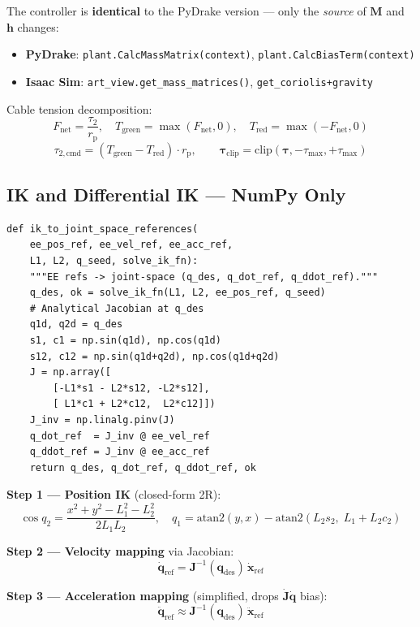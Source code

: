 \documentclass[11pt,a4paper]{article}
\newcommand{\rp}{r_{\mathrm{p}}}
\newcommand{\bq}{\bm{q}}
\newcommand{\bdq}{\dot{\bm{q}}}
\newcommand{\bddq}{\ddot{\bm{q}}}
\newcommand{\btau}{\bm{\tau}}
\newcommand{\bM}{\bm{M}}
\newcommand{\bh}{\bm{h}}
\newcommand{\bJ}{\bm{J}}
\newcommand{\bx}{\bm{x}}
\begin{document}
\begin{codemath}
The controller is \textbf{identical} to the PyDrake version --- only the \emph{source} of $\bM$ and $\bh$ changes:
\begin{itemize}
    \item \textbf{PyDrake}: \texttt{plant.CalcMassMatrix(context)}, \texttt{plant.CalcBiasTerm(context)}
    \item \textbf{Isaac Sim}: \texttt{art\_view.get\_mass\_matrices()}, \texttt{get\_coriolis+gravity}
\end{itemize}

Cable tension decomposition:
\[
    F_{\mathrm{net}} = \frac{\tau_2}{\rp}, \quad
    T_{\mathrm{green}} = \max(F_{\mathrm{net}}, 0), \quad
    T_{\mathrm{red}} = \max(-F_{\mathrm{net}}, 0)
\]
\[
    \tau_{2,\mathrm{cmd}} = (T_{\mathrm{green}} - T_{\mathrm{red}}) \cdot \rp, \qquad
    \btau_{\mathrm{clip}} = \mathrm{clip}(\btau, -\tau_{\max}, +\tau_{\max})
\]
\end{codemath}

\subsection{IK and Differential IK --- NumPy Only}

\begin{lstlisting}[caption={IK-to-joint-space pipeline --- \texttt{controller/computed\_torque\_isaacsim.py}}]
def ik_to_joint_space_references(
    ee_pos_ref, ee_vel_ref, ee_acc_ref,
    L1, L2, q_seed, solve_ik_fn):
    """EE refs -> joint-space (q_des, q_dot_ref, q_ddot_ref)."""
    q_des, ok = solve_ik_fn(L1, L2, ee_pos_ref, q_seed)
    # Analytical Jacobian at q_des
    q1d, q2d = q_des
    s1, c1 = np.sin(q1d), np.cos(q1d)
    s12, c12 = np.sin(q1d+q2d), np.cos(q1d+q2d)
    J = np.array([
        [-L1*s1 - L2*s12, -L2*s12],
        [ L1*c1 + L2*c12,  L2*c12]])
    J_inv = np.linalg.pinv(J)
    q_dot_ref  = J_inv @ ee_vel_ref
    q_ddot_ref = J_inv @ ee_acc_ref
    return q_des, q_dot_ref, q_ddot_ref, ok
\end{lstlisting}

\begin{codemath}
\textbf{Step 1 --- Position IK} (closed-form 2R):
\[
    \cos q_2 = \frac{x^2 + y^2 - L_1^2 - L_2^2}{2L_1 L_2}, \quad
    q_1 = \text{atan2}(y, x) - \text{atan2}(L_2 s_2,\; L_1 + L_2 c_2)
\]

\textbf{Step 2 --- Velocity mapping} via Jacobian:
\[
    \bdq_{\mathrm{ref}} = \bJ^{-1}(\bq_{\mathrm{des}})\,\dot{\bx}_{\mathrm{ref}}
\]

\textbf{Step 3 --- Acceleration mapping} (simplified, drops $\dot{\bJ}\bdq$ bias):
\[
    \bddq_{\mathrm{ref}} \approx \bJ^{-1}(\bq_{\mathrm{des}})\,\ddot{\bx}_{\mathrm{ref}}
\]
\end{codemath}
\end{document}
